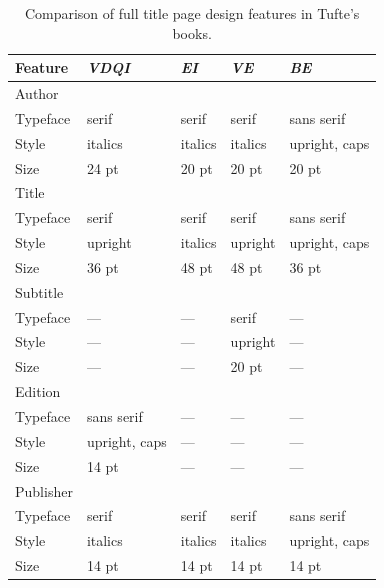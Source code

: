 \documentclass[a4paper]{tufte-book}
\newcommand{\vdqi}{\textit{VDQI}\xspace}
\newcommand{\ei}{\textit{EI}\xspace}
\newcommand{\ve}{\textit{VE}\xspace}
\newcommand{\be}{\textit{BE}\xspace}
\newcommand{\na}{\quad---}
\begin{document}
\bigskip
\begin{table}[h]
  \footnotesize%
  \begin{center}
    \begin{tabular}{lllll}
      \toprule
      Feature & \vdqi & \ei & \ve & \be \\
      \midrule
      Author & & & & \\
      \quad Typeface & serif   & serif   & serif   & sans serif \\
      \quad Style    & italics & italics & italics & upright, caps \\
      \quad Size     & 24 pt   & 20 pt   & 20 pt   & 20 pt \\
      \addlinespace
      Title & & & & \\
      \quad Typeface & serif   & serif   & serif   & sans serif \\
      \quad Style    & upright & italics & upright & upright, caps \\
      \quad Size     & 36 pt   & 48 pt   & 48 pt   & 36 pt \\
      \addlinespace
      Subtitle & & & & \\
      \quad Typeface & \na     & \na     & serif   & \na \\
      \quad Style    & \na     & \na     & upright & \na \\
      \quad Size     & \na     & \na     & 20 pt   & \na \\
      \addlinespace
      Edition & & & & \\
      \quad Typeface & sans serif    & \na  & \na  & \na \\
      \quad Style    & upright, caps & \na  & \na  & \na \\
      \quad Size     & 14 pt         & \na  & \na  & \na \\
      \addlinespace
      Publisher & & & & \\
      \quad Typeface & serif   & serif   & serif   & sans serif \\
      \quad Style    & italics & italics & italics & upright, caps \\
      \quad Size     & 14 pt   & 14 pt   & 14 pt   & 14 pt \\
      \bottomrule
      \end{tabular}
      \caption{Comparison of full title page design features in Tufte's books.}%
      \label{tab:title-page}
  \end{center}
\end{table}
\end{document}
